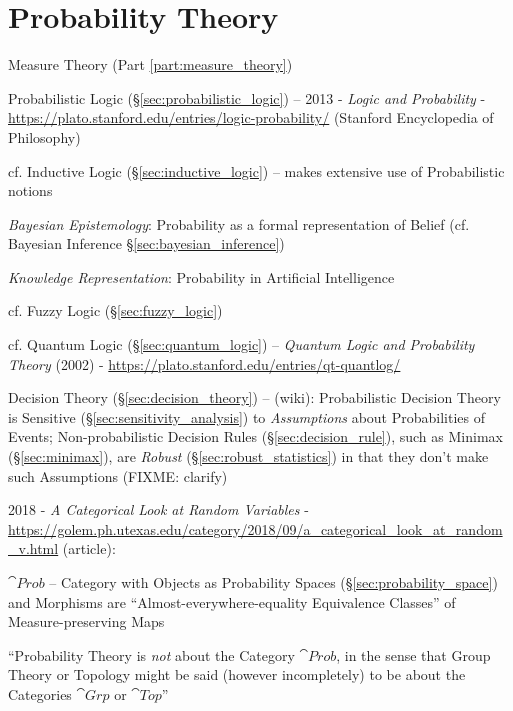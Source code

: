 \part{Probability Theory}\label{part:probability_theory}

\fist Measure Theory (Part \ref{part:measure_theory})

\fist Probabilistic Logic (\S\ref{sec:probabilistic_logic}) --
2013 - \emph{Logic and Probability} -
\url{https://plato.stanford.edu/entries/logic-probability/} (Stanford
Encyclopedia of Philosophy)

\fist cf. Inductive Logic (\S\ref{sec:inductive_logic}) -- makes extensive use
of Probabilistic notions

\emph{Bayesian Epistemology}: Probability as a formal representation of Belief
(cf. Bayesian Inference \S\ref{sec:bayesian_inference})

\emph{Knowledge Representation}: Probability in Artificial Intelligence

\fist cf. Fuzzy Logic (\S\ref{sec:fuzzy_logic})

\fist cf. Quantum Logic (\S\ref{sec:quantum_logic}) --
\emph{Quantum Logic and Probability Theory} (2002) -
\url{https://plato.stanford.edu/entries/qt-quantlog/}

\fist Decision Theory (\S\ref{sec:decision_theory}) --
(wiki): Probabilistic Decision Theory is Sensitive
(\S\ref{sec:sensitivity_analysis}) to \emph{Assumptions} about Probabilities of
Events; Non-probabilistic Decision Rules (\S\ref{sec:decision_rule}), such as
Minimax (\S\ref{sec:minimax}), are \emph{Robust} (\S\ref{sec:robust_statistics})
in that they don't make such Assumptions (FIXME: clarify)

2018 - \emph{A Categorical Look at Random Variables} -
\url{https://golem.ph.utexas.edu/category/2018/09/a_categorical_look_at_random_v.html} (article):

$\cat{Prob}$ -- Category with Objects as Probability Spaces
(\S\ref{sec:probability_space}) and Morphisms are ``Almost-everywhere-equality
Equivalence Classes'' of Measure-preserving Maps

``Probability Theory is \emph{not} about the Category $\cat{Prob}$, in the sense
that Group Theory or Topology might be said (however incompletely) to be about
the Categories $\cat{Grp}$ or $\cat{Top}$''

